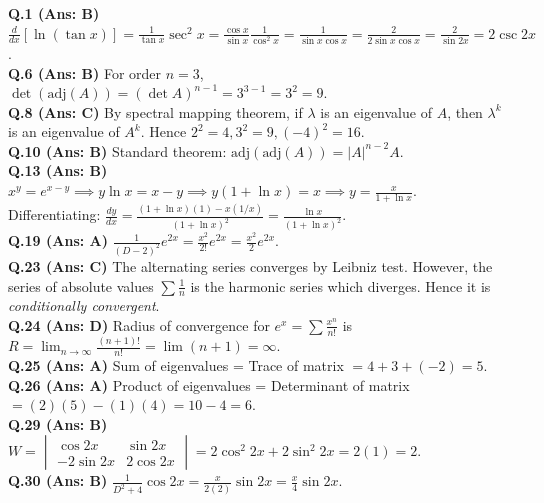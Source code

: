 \begin{solutionbox}
\textbf{Q.1 (Ans: B)} $\frac{d}{dx}[\ln(\tan x)] = \frac{1}{\tan x}\sec^2 x = \frac{\cos x}{\sin x}\frac{1}{\cos^2 x} = \frac{1}{\sin x \cos x} = \frac{2}{2\sin x \cos x} = \frac{2}{\sin 2x} = 2\csc 2x$.\\[2mm]
\textbf{Q.6 (Ans: B)} For order $n=3$, $\det(\text{adj}(A)) = (\det A)^{n-1} = 3^{3-1} = 3^2 = 9$.\\[2mm]
\textbf{Q.8 (Ans: C)} By spectral mapping theorem, if $\lambda$ is an eigenvalue of $A$, then $\lambda^k$ is an eigenvalue of $A^k$. Hence $2^2=4, 3^2=9, (-4)^2=16$.\\[2mm]
\textbf{Q.10 (Ans: B)} Standard theorem: $\text{adj}(\text{adj}(A)) = |A|^{n-2} A$.\\[2mm]
\textbf{Q.13 (Ans: B)} $x^y = e^{x-y} \implies y \ln x = x - y \implies y(1 + \ln x) = x \implies y = \frac{x}{1 + \ln x}$.\\
Differentiating: $\frac{dy}{dx} = \frac{(1+\ln x)(1) - x(1/x)}{(1+\ln x)^2} = \frac{\ln x}{(1+\ln x)^2}$.\\[2mm]
\textbf{Q.19 (Ans: A)} $\frac{1}{(D-2)^2}e^{2x} = \frac{x^2}{2!}e^{2x} = \frac{x^2}{2}e^{2x}$.\\[2mm]
\textbf{Q.23 (Ans: C)} The alternating series converges by Leibniz test. However, the series of absolute values $\sum \frac{1}{n}$ is the harmonic series which diverges. Hence it is \textit{conditionally convergent}.\\[2mm]
\textbf{Q.24 (Ans: D)} Radius of convergence for $e^x = \sum \frac{x^n}{n!}$ is $R = \lim_{n\to\infty} \frac{(n+1)!}{n!} = \lim (n+1) = \infty$.\\[2mm]
\textbf{Q.25 (Ans: A)} Sum of eigenvalues = Trace of matrix $= 4 + 3 + (-2) = 5$.\\[2mm]
\textbf{Q.26 (Ans: A)} Product of eigenvalues = Determinant of matrix $= (2)(5) - (1)(4) = 10 - 4 = 6$.\\[2mm]
\textbf{Q.29 (Ans: B)} $W = \begin{vmatrix} \cos 2x & \sin 2x \\ -2\sin 2x & 2\cos 2x \end{vmatrix} = 2\cos^2 2x + 2\sin^2 2x = 2(1) = 2$.\\[2mm]
\textbf{Q.30 (Ans: B)} $\frac{1}{D^2+4}\cos 2x = \frac{x}{2(2)}\sin 2x = \frac{x}{4}\sin 2x$.
\end{solutionbox}

\newpage
